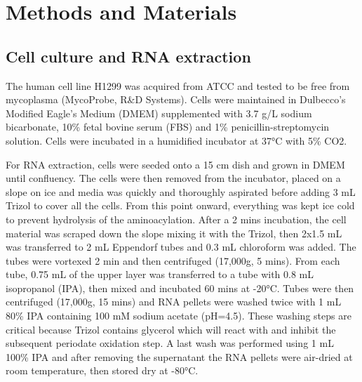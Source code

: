 \documentclass[9pt,lineno]{elife}
\begin{document}
\section{Methods and Materials}
\subsection{Cell culture and RNA extraction}
The human cell line H1299 was acquired from ATCC and tested to be free from mycoplasma (MycoProbe, R\&D Systems).
Cells were maintained in Dulbecco’s Modified Eagle’s Medium (DMEM) supplemented with 3.7 g/L sodium bicarbonate, 10\% fetal bovine serum (FBS) and 1\% penicillin-streptomycin solution.
Cells were incubated in a humidified incubator at 37°C with 5\% CO2.

For RNA extraction, cells were seeded onto a 15 cm dish and grown in DMEM until confluency.
The cells were then removed from the incubator, placed on a slope on ice and media was quickly and thoroughly aspirated before adding 3 mL Trizol to cover all the cells.
From this point onward, everything was kept ice cold to prevent hydrolysis of the aminoacylation.
After a 2 mins incubation, the cell material was scraped down the slope mixing it with the Trizol, then 2x1.5 mL was transferred to 2 mL Eppendorf tubes and 0.3 mL chloroform was added.
The tubes were vortexed 2 min and then centrifuged (17,000g, 5 mins).
From each tube, 0.75 mL of the upper layer was transferred to a tube with 0.8 mL isopropanol (IPA), then mixed and incubated 60 mins at -20°C.
Tubes were then centrifuged (17,000g, 15 mins) and RNA pellets were washed twice with 1 mL 80\% IPA containing 100 mM sodium acetate (pH=4.5).
These washing steps are critical because Trizol contains glycerol which will react with and inhibit the subsequent periodate oxidation step.
A last wash was performed using 1 mL 100\% IPA and after removing the supernatant the RNA pellets were air-dried at room temperature, then stored dry at -80°C.
\end{document}
